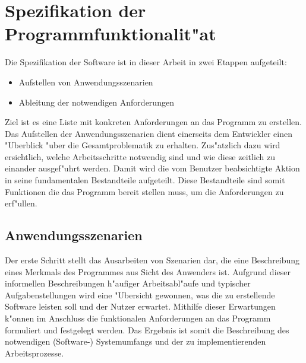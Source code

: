 \chapter{Spezifikation der Programmfunktionalit"at}
\label{chap:spezifikation}

Die Spezifikation der Software ist in dieser Arbeit in zwei Etappen aufgeteilt:
\begin{itemize}
	\item Aufstellen von Anwendungsszenarien
	\item Ableitung der notwendigen Anforderungen
\end{itemize}
Ziel ist es eine Liste mit konkreten Anforderungen an das Programm zu erstellen.
Das Aufstellen der Anwendungsszenarien dient einerseits dem Entwickler einen "Uberblick "uber die Gesamtproblematik zu erhalten.
Zus"atzlich dazu wird ersichtlich, welche Arbeitsschritte notwendig sind und wie diese zeitlich zu einander ausgef"uhrt werden.
Damit wird die vom Benutzer beabsichtigte Aktion in seine fundamentalen Bestandteile aufgeteilt.
Diese Bestandteile sind somit Funktionen die das Programm bereit stellen muss, um die Anforderungen zu erf"ullen.

\section{Anwendungsszenarien}
\label{sec:anwendungsszenarien}


Der erste Schritt stellt das Ausarbeiten von Szenarien dar, die eine Beschreibung eines Merkmals des Programmes aus Sicht des Anwenders ist.
Aufgrund dieser informellen Beschreibungen h"aufiger Arbeitsabl"aufe und typischer Aufgabenstellungen wird eine "Ubersicht gewonnen, was die zu erstellende Software leisten soll und der Nutzer erwartet.
Mithilfe dieser Erwartungen k"onnen im Anschluss die funktionalen Anforderungen an das Programm formuliert und festgelegt werden.
Das Ergebnis ist somit die Beschreibung des notwendigen (Software-) Systemumfangs und der zu implementierenden Arbeitsprozesse.

